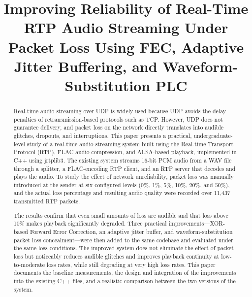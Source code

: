 \documentclass[conference]{IEEEtran}
\begin{document}
\title{Improving Reliability of Real-Time RTP Audio Streaming Under Packet Loss Using FEC, Adaptive Jitter Buffering, and Waveform-Substitution PLC}

\author{
}

\maketitle

\begin{abstract}

Real-time audio streaming over UDP is widely used because UDP avoids the delay penalties of retransmission-based protocols such as TCP. However, UDP does not guarantee delivery, and packet loss on the network directly translates into audible glitches, dropouts, and interruptions. This paper presents a practical, undergraduate-level study of a real-time audio streaming system built using the Real-time Transport Protocol (RTP), FLAC audio compression, and ALSA-based playback, implemented in C++ using jrtplib3. The existing system streams 16-bit PCM audio from a WAV file through a splitter, a FLAC-encoding RTP client, and an RTP server that decodes and plays the audio. To study the effect of network unreliability, packet loss was manually introduced at the sender at six configured levels (0\%, 1\%, 5\%, 10\%, 20\%, and 50\%), and the actual loss percentage and resulting audio quality were recorded over 11,437 transmitted RTP packets.

The results confirm that even small amounts of loss are audible and that loss above 10\% makes playback significantly degraded. Three practical improvements—XOR-based Forward Error Correction, an adaptive jitter buffer, and waveform-substitution packet loss concealment—were then added to the same codebase and evaluated under the same loss conditions. The improved system does not eliminate the effect of packet loss but noticeably reduces audible glitches and improves playback continuity at low-to-moderate loss rates, while still degrading at very high loss rates. This paper documents the baseline measurements, the design and integration of the improvements into the existing C++ files, and a realistic comparison between the two versions of the system.

\end{abstract}
\end{document}
